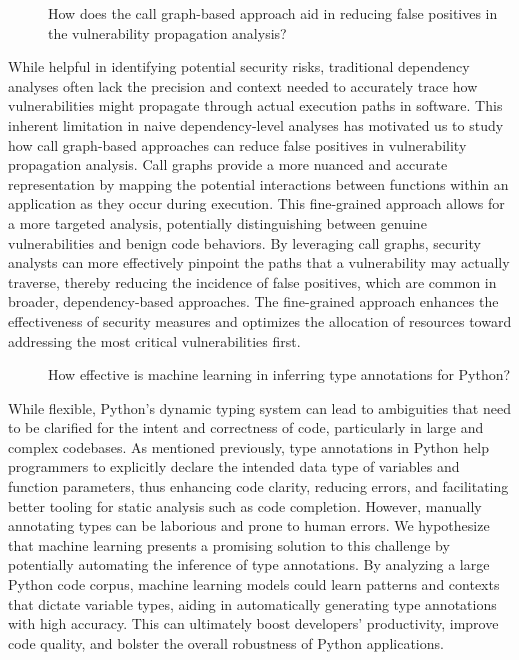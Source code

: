 \begin{description}
     \item[] How does the call graph-based approach aid in reducing false positives in the vulnerability propagation analysis?
\end{description}

\noindent
While helpful in identifying potential security risks, traditional dependency analyses often lack the precision and context needed to accurately trace how vulnerabilities might propagate through actual execution paths in software. This inherent limitation in naive dependency-level analyses has motivated us to study how call graph-based approaches can reduce false positives in vulnerability propagation analysis. Call graphs provide a more nuanced and accurate representation by mapping the potential interactions between functions within an application as they occur during execution. This fine-grained approach allows for a more targeted analysis, potentially distinguishing between genuine vulnerabilities and benign code behaviors. By leveraging call graphs, security analysts can more effectively pinpoint the paths that a vulnerability may actually traverse, thereby reducing the incidence of false positives, which are common in broader, dependency-based approaches. The fine-grained approach enhances the effectiveness of security measures and optimizes the allocation of resources toward addressing the most critical vulnerabilities first.
    
\begin{description}
    \item[] How effective is machine learning in inferring type annotations for Python?
\end{description}

\noindent
 While flexible, Python's dynamic typing system can lead to ambiguities that need to be clarified for the intent and correctness of code, particularly in large and complex codebases. As mentioned previously, type annotations in Python help programmers to explicitly declare the intended data type of variables and function parameters, thus enhancing code clarity, reducing errors, and facilitating better tooling for static analysis such as code completion. However, manually annotating types can be laborious and prone to human errors. We hypothesize that machine learning presents a promising solution to this challenge by potentially automating the inference of type annotations. By analyzing a large Python code corpus, machine learning models could learn patterns and contexts that dictate variable types, aiding in automatically generating type annotations with high accuracy. This can ultimately boost developers' productivity, improve code quality, and bolster the overall robustness of Python applications.

